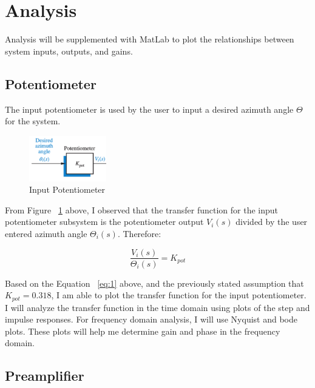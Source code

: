 \documentclass[12pt]{article}
\begin{document}
\section{Analysis}

Analysis will be supplemented with MatLab to plot the relationships between system inputs, outputs, and gains.

\subsection{Potentiometer}

The input potentiometer is used by the user to input a desired azimuth angle $\Theta$ for the system.

\begin{figure}[H]
\begin{center}
	\includegraphics[width=0.3\textwidth]{./img/PotentiometerBlock.png}
	\caption{\label{fig:pot}Input Potentiometer}
\end{center}
\end{figure}

From Figure ~\ref{fig:pot} above, I observed that the transfer function for the input potentiometer subsystem is the potentiometer output $V_{i}(s)$ divided by the user entered azimuth angle $\Theta_{i}(s)$. Therefore:

\begin{equation}
\frac{V_{i}(s)}{\Theta_i(s)} = K_{pot}\label{eq:1}
\end{equation}

Based on the Equation ~\ref{eq:1} above, and the previously stated assumption that $K_{pot} = 0.318$, I am able to plot the transfer function for the input potentiometer. I will analyze the transfer function in the time domain using plots of the step and impulse responses. For frequency domain analysis, I will use Nyquist and bode plots. These plots will help me determine gain and phase in the frequency domain.


\subsection{Preamplifier}
\end{document}

